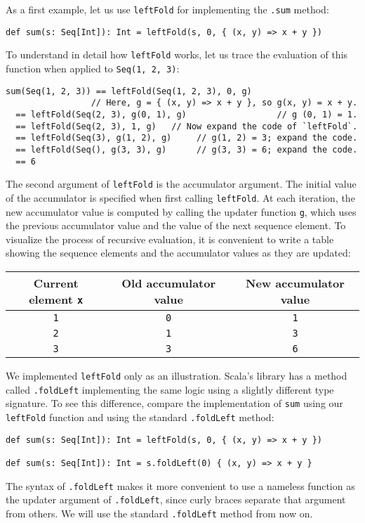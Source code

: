 As a first example, let us use \lstinline!leftFold! for implementing
the \lstinline!.sum! method:
\begin{lstlisting}
def sum(s: Seq[Int]): Int = leftFold(s, 0, { (x, y) => x + y })
\end{lstlisting}
To understand in detail how \lstinline!leftFold! works, let us trace
the evaluation of this function when applied to \lstinline!Seq(1, 2, 3)!:
\begin{lstlisting}
sum(Seq(1, 2, 3)) == leftFold(Seq(1, 2, 3), 0, g)
                 // Here, g = { (x, y) => x + y }, so g(x, y) = x + y.
  == leftFold(Seq(2, 3), g(0, 1), g)                  // g (0, 1) = 1.
  == leftFold(Seq(2, 3), 1, g)   // Now expand the code of `leftFold`.
  == leftFold(Seq(3), g(1, 2), g)     // g(1, 2) = 3; expand the code.
  == leftFold(Seq(), g(3, 3), g)      // g(3, 3) = 6; expand the code.
  == 6
\end{lstlisting}
The second argument of \lstinline!leftFold! is the accumulator argument.
The initial value of the accumulator is specified when first calling
\lstinline!leftFold!. At each iteration, the new accumulator value
is computed by calling the updater function \lstinline!g!, which
uses the previous accumulator value and the value of the next sequence
element. To visualize the process of recursive evaluation, it is convenient
to write a table showing the sequence elements and the accumulator
values as they are updated:
\begin{center}
\begin{tabular}{|c|c|c|}
\hline 
\textbf{\small{}Current element }\lstinline!x! & \textbf{\small{}Old accumulator value} & \textbf{\small{}New accumulator value}\tabularnewline
\hline 
\hline 
{\small{}}\lstinline!1! & {\small{}}\lstinline!0! & {\small{}}\lstinline!1!\tabularnewline
\hline 
{\small{}}\lstinline!2! & {\small{}}\lstinline!1! & {\small{}}\lstinline!3!\tabularnewline
\hline 
{\small{}}\lstinline!3! & {\small{}}\lstinline!3! & {\small{}}\lstinline!6!\tabularnewline
\hline 
\end{tabular}
\par\end{center}

We implemented \lstinline!leftFold! only as an illustration. Scala's
library has a method called \lstinline!.foldLeft! implementing the
same logic using a slightly different type signature. To see this
difference, compare the implementation of \lstinline!sum! using our
\lstinline!leftFold! function and using the standard \lstinline!.foldLeft!
method:
\begin{lstlisting}
def sum(s: Seq[Int]): Int = leftFold(s, 0, { (x, y) => x + y })

def sum(s: Seq[Int]): Int = s.foldLeft(0) { (x, y) => x + y }
\end{lstlisting}
The syntax of \lstinline!.foldLeft! makes it more convenient to use
a nameless function as the updater argument of \lstinline!.foldLeft!,
since curly braces separate that argument from others. We will use
the standard \lstinline!.foldLeft! method from now on.

